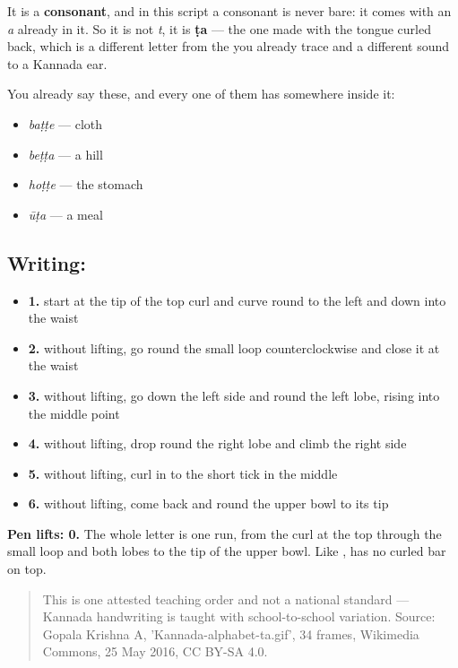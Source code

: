 It is a \textbf{consonant}, and in this script a consonant is never bare: it comes with an \emph{a} already in it. So it is not \emph{t}, it is \textbf{ṭa} — the one made with the tongue curled back, which is a different letter from the  you already trace and a different sound to a Kannada ear.

You already say these, and every one of them has  somewhere inside it:

\begin{itemize}
\raggedright
  \item \textbf{} \emph{baṭṭe} — cloth
  \item \textbf{} \emph{beṭṭa} — a hill
  \item \textbf{} \emph{hoṭṭe} — the stomach
  \item \textbf{} \emph{ūṭa} — a meal
\end{itemize}

\subsection*{Writing: }

\begin{itemize}
\raggedright
  \item \textbf{1.} start at the tip of the top curl and curve round to the left and down into the waist
  \item \textbf{2.} without lifting, go round the small loop counterclockwise and close it at the waist
  \item \textbf{3.} without lifting, go down the left side and round the left lobe, rising into the middle point
  \item \textbf{4.} without lifting, drop round the right lobe and climb the right side
  \item \textbf{5.} without lifting, curl in to the short tick in the middle
  \item \textbf{6.} without lifting, come back and round the upper bowl to its tip
\end{itemize}

\textbf{Pen lifts: 0.} The whole letter is one run, from the curl at the top through the small loop and both lobes to the tip of the upper bowl. Like ,  has no curled bar on top.

\begin{quote}
This is one attested teaching order and not a national standard — Kannada handwriting is taught with school-to-school variation. Source: Gopala Krishna A, 'Kannada-alphabet-ta.gif', 34 frames, Wikimedia Commons, 25 May 2016, CC BY-SA 4.0.
\end{quote}

